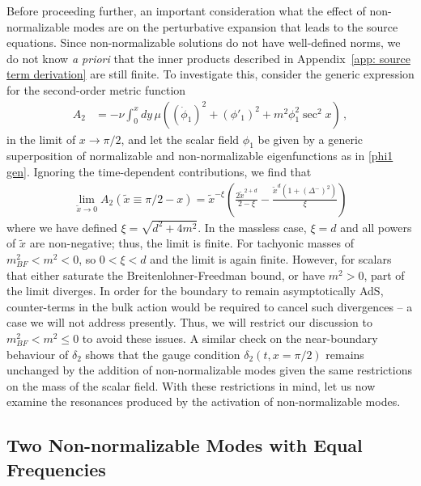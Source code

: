 \documentclass[letterpaper,11pt]{article}
\begin{document}
Before proceeding further, an important consideration what the effect of non-normalizable modes are on the perturbative expansion that leads to the source equations. Since non-normalizable solutions do not have well-defined norms, we do not know \emph{a priori} that the inner products described in Appendix~\ref{app: source term derivation} are still finite. To investigate this, consider the generic expression for the second-order metric function
\begin{align}
A_2 &= - \nu \int^x_0 dy \, \mu \left( (\dot \phi_1)^2 + (\phi'_1)^2 + m^2 \phi_1^2 \sec^2 x \right) \, ,
\end{align}
in the limit of $x \to \pi/2$, and let the scalar field $\phi_1$ be given by a generic superposition of normalizable and non-normalizable eigenfunctions as in \eqref{phi1 gen}. Ignoring the time-dependent contributions, we find that
\begin{align}
\lim_{\tilde x \to 0} A_2 (\tilde x \equiv \pi /2 - x) = \tilde{x}^{-\xi} \left( \frac{2 \tilde{x}^{2+d}}{2 - \xi} - \frac{\tilde{x}^d (1 + \left(\Delta^{-}\right)^2)}{\xi} \right)
\end{align}
where we have defined $\xi = \sqrt{d^2 + 4m^2}$. In the massless case, $\xi = d$ and all powers of $\tilde{x}$ are non-negative; thus, the limit is finite. For tachyonic masses of $m^2_{BF} < m^2 < 0$, so $0 < \xi < d$ and the limit is again finite. However, for scalars that either saturate the Breitenlohner-Freedman bound, or have $m^2 > 0$, part of the limit diverges. In order for the boundary to remain asymptotically AdS, counter-terms in the bulk action would be required to cancel such divergences -- a case we will not address presently. Thus, we will restrict our discussion to $m^2_{BF} < m^2 \leq 0$ to avoid these issues. A similar check on the near-boundary behaviour of $\delta_2$ shows that the gauge condition $\delta_2 (t, x=\pi/2)$ remains unchanged by the addition of non-normalizable modes given the same restrictions on the mass of the scalar field. With these restrictions in mind, let us now examine the resonances produced by the activation of non-normalizable modes.

\subsection{Two Non-normalizable Modes with Equal Frequencies}
\label{ssec: equalNN}
\end{document}
